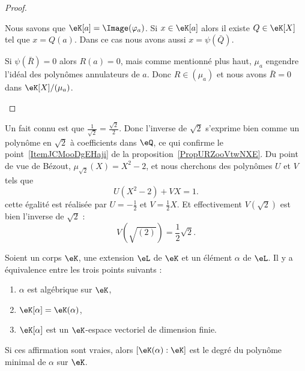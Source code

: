 \begin{proof}
\begin{enumerate}
\begin{subproof}
			      Nous savons que \( \eK[a]=\Image(\varphi_a)\). Si \( x\in \eK[a]\) alors il existe \( Q\in \eK[X]\) tel que \( x=Q(a)\). Dans ce cas nous avons aussi \( x=\psi(\bar Q)\).

			      \spitem[Injective]

			      Si \( \psi(\bar R)=0\) alors \( R(a)=0\), mais comme mentionné plus haut, \( \mu_a\) engendre l'idéal des polynômes annulateurs de \( a\). Donc \( R\in (\mu_a)\) et nous avons \( \bar R=0\) dans \( \eK[X]/(\mu_a)\).

		      \end{subproof}

	\end{enumerate}
\end{proof}

\begin{example}
	Un fait connu est que \( \frac{1}{ \sqrt{2} }=\frac{ \sqrt{2} }{ 2 }\). Donc l'inverse de \( \sqrt{2}\) s'exprime bien comme un polynôme en \( \sqrt{2}\) à coefficients dans \( \eQ\), ce qui confirme le point~\ref{ItemJCMooDgEHaji} de la proposition~\ref{PropURZooVtwNXE}. Du point de vue de Bézout, \( \mu_{\sqrt{2}}(X)=X^2-2\), et nous cherchons des polynômes \( U\) et \( V\) tels que
	\begin{equation}
		U(X^2-2)+VX=1.
	\end{equation}
	cette égalité est réalisée par \( U=-\frac{ 1 }{2}\) et \( V=\frac{ 1 }{2}X\). Et effectivement \( V(\sqrt{2})\) est bien l'inverse de \( \sqrt{2}\) :
	\begin{equation}
		V(\sqrt{(2)})=\frac{ 1 }{2}\sqrt{2}.
	\end{equation}
\end{example}


\begin{proposition}      \label{PROPooNGJWooYSpwVn}
	Soient un corps \( \eK\), une extension \( \eL\) de \( \eK\) et un élément \( \alpha\) de \( \eL\). Il y a équivalence entre les trois points suivants :
	\begin{enumerate}
		\item   \label{ITEMooYTEBooUuEfBz}
		      \( \alpha\) est algébrique sur \( \eK\),
		\item   \label{ITEMooWMQTooLnepQl}
		      \( \eK[\alpha]=\eK(\alpha)\),
		\item   \label{ITEMooAQIUooMVZojp}
		      \( \eK[\alpha]\) est un \( \eK\)-espace vectoriel de dimension finie.
	\end{enumerate}
	Si ces affirmation sont vraies, alors \( [\eK(\alpha):\eK]\) est le degré du polynôme minimal de \( \alpha\) sur \( \eK\).
\end{proposition}

